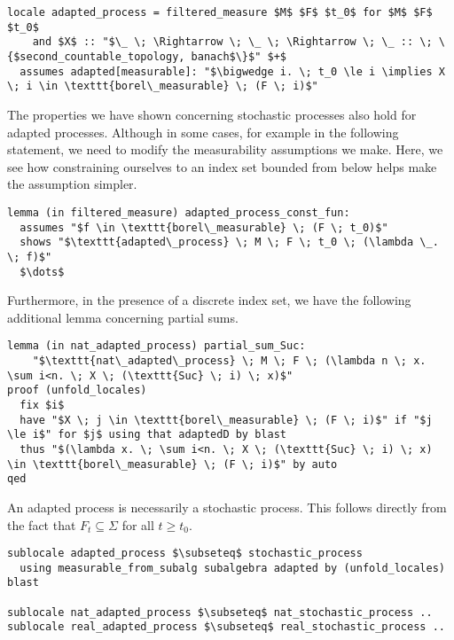 \begin{isalemma}
{\small
\begin{lstlisting}[style=isabelle]
locale adapted_process = filtered_measure $M$ $F$ $t_0$ for $M$ $F$ $t_0$ 
	and $X$ :: "$\_ \; \Rightarrow \; \_ \; \Rightarrow \; \_ :: \; \{$second_countable_topology, banach$\}$" $+$
  assumes adapted[measurable]: "$\bigwedge i. \; t_0 \le i \implies X \; i \in \texttt{borel\_measurable} \; (F \; i)$"
\end{lstlisting}
}
\end{isalemma}

The properties we have shown concerning stochastic processes also hold for adapted processes. Although in some cases, for example in the following statement, we need to modify the measurability assumptions we make. Here, we see how constraining ourselves to an index set bounded from below helps make the assumption simpler.

\begin{isalemma}
{\small
\begin{lstlisting}[style=isabelle]
lemma (in filtered_measure) adapted_process_const_fun:
  assumes "$f \in \texttt{borel\_measurable} \; (F \; t_0)$"
  shows "$\texttt{adapted\_process} \; M \; F \; t_0 \; (\lambda \_. \; f)$"
  $\dots$
\end{lstlisting}
}
\end{isalemma}

Furthermore, in the presence of a discrete index set, we have the following additional lemma concerning partial sums.

\begin{isalemma}
{\small
\begin{lstlisting}[style=isabelle]
lemma (in nat_adapted_process) partial_sum_Suc: 
	"$\texttt{nat\_adapted\_process} \; M \; F \; (\lambda n \; x. \sum i<n. \; X \; (\texttt{Suc} \; i) \; x)$" 
proof (unfold_locales)
  fix $i$
  have "$X \; j \in \texttt{borel\_measurable} \; (F \; i)$" if "$j \le i$" for $j$ using that adaptedD by blast
  thus "$(\lambda x. \; \sum i<n. \; X \; (\texttt{Suc} \; i) \; x) \in \texttt{borel\_measurable} \; (F \; i)$" by auto
qed
\end{lstlisting}
}
\end{isalemma}

An adapted process is necessarily a stochastic process. This follows directly from the fact that $F_t \subseteq \Sigma$ for all $t \ge t_0$.

\begin{isalemma}
{\small
\begin{lstlisting}[style=isabelle]
sublocale adapted_process $\subseteq$ stochastic_process 
  using measurable_from_subalg subalgebra adapted by (unfold_locales) blast

sublocale nat_adapted_process $\subseteq$ nat_stochastic_process ..
sublocale real_adapted_process $\subseteq$ real_stochastic_process ..
\end{lstlisting}
}
\end{isalemma}


